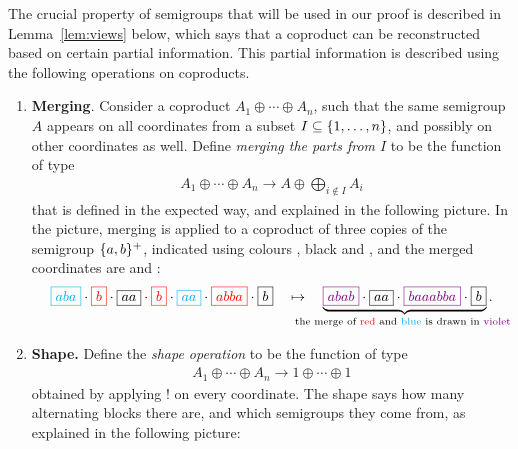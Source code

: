 
The crucial property of semigroups that will be used in our proof is described in Lemma~\ref{lem:views} below, which says that a coproduct can be reconstructed based on certain partial information. This partial information is described  using the following operations on coproducts.

\begin{enumerate}
    \item \textbf{Merging}. Consider a coproduct $A_1 \oplus \cdots \oplus A_n$, such that the same semigroup $A$ appears on all coordinates from a subset $I \subseteq \{1,\ldots,n\}$, and possibly on other coordinates as well. Define \emph{merging the parts from $I$} to be the function of type 
    \begin{align*}
        A_1 \oplus \cdots \oplus A_n \to  A \oplus \bigoplus_{i \not \in I} A_i
        \end{align*}
    that is defined in the expected way, and explained in the following picture. In the picture, merging is applied to  a coproduct of three copies of the semigroup $\{a,b\}^+$, indicated using colours , black and , and the merged coordinates are  and :
        \begin{align*}
        \blue{\boxed{aba}} \cdot 
        \red{\boxed{b}} \cdot 
        \boxed{aa} \cdot 
        \red{\boxed{b}} \cdot 
        \blue{\boxed{aa}} \cdot 
        \red{\boxed{abba}} \cdot 
        \boxed{b}
        \quad \mapsto \quad  
        \myunderbrace{
            \violet{\boxed{abab}} \cdot 
        \boxed{aa} \cdot 
        \violet{\boxed{baaabba}} \cdot 
        \boxed{b}
        }{the merge of \red{red} and \blue{blue} is drawn in \violet{violet}}.\end{align*}    
        \item \textbf {Shape.}  Define the \emph{shape operation} to be the function of type 
        \begin{align*}
        A_1 \oplus \cdots \oplus A_n \to 1 \oplus \cdots \oplus 1
        \end{align*}
        obtained by applying $!$ on every coordinate. The shape says how many alternating blocks there are, and which semigroups they come from, as explained in the following picture:
        \begin{align*}

\end{align*}
\end{enumerate}
